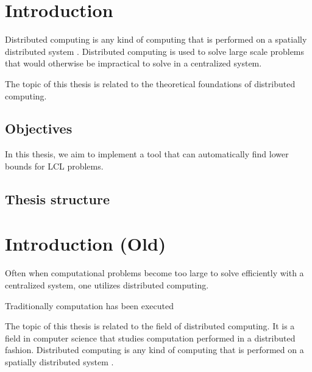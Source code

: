 
\section{Introduction}  \label{sec:introduction}

Distributed computing is any kind of computing that is performed on a spatially distributed system
\cite{DBLP:books/el/leeuwen90/LamportL90}.
Distributed computing is used to solve large scale problems that would otherwise be impractical to solve in a centralized system.



The topic of this thesis is related to the theoretical foundations of distributed computing.


\subsection{Objectives}
In this thesis, we aim to implement a tool that can automatically find lower bounds for LCL problems.

\subsection{Thesis structure}



\section*{Introduction (Old)}





Often when computational problems become too large to solve efficiently with a centralized system, one utilizes distributed computing.



Traditionally computation has been executed 

The topic of this thesis is related to the field of distributed computing.
It is a field in computer science that studies computation performed in a distributed fashion.
Distributed computing is any kind of computing that is performed on a spatially distributed system
\cite{DBLP:books/el/leeuwen90/LamportL90}.


